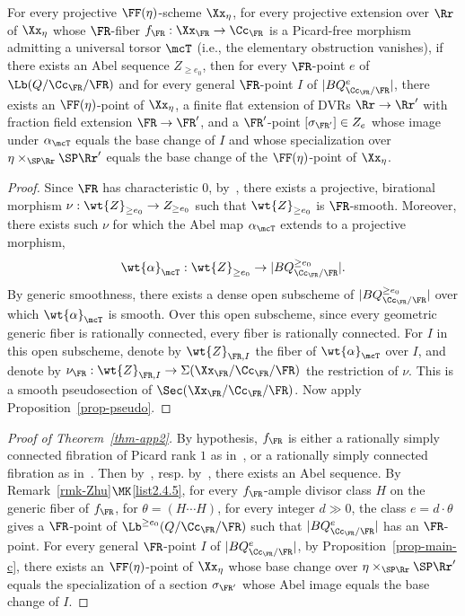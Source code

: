\begin{prop}\label{prop-main-c}
For every projective $\FF(\eta)$-scheme $\Xx_\eta$, for every projective extension over $\Rr$ of $\Xx_\eta$ whose $\FR$-fiber $f_\FR:\Xx_\FR \to
\Cc_\FR$ is a Picard-free morphism admitting a universal torsor $\mcT$ (i.e., the elementary obstruction vanishes), if there exists an Abel sequence $Z_{\geq e_0}$, then for every $\FR$-point $e$ of $\Lb(Q/\Cc_\FR/\FR)$ and for every general $\FR$-point $I$ of $|BQ^e_{\Cc_\FR/\FR}|$, there exists an $\FF(\eta)$-point of $\Xx_\eta$, a finite flat extension of DVRs $\Rr \to \Rr'$ with fraction field extension $\FR\to \FR'$, and a $\FR'$-point $[\sigma_{\FR'}] \in Z_{e}$ whose image under $\alpha_{\mcT}$ equals the base change of $I$ and whose specialization over $\eta \times_{\SP \Rr}\SP \Rr'$ equals the base change of the $\FF(\eta)$-point of $\Xx_\eta$.
\end{prop}

\begin{proof}
Since $\FR$ has characteristic $0$, by~\cite{Hir}, there exists a projective, birational morphism $\nu:\wt{Z}_{\geq e_0} \to Z_{\geq e_0}$ such that $\wt{Z}_{\geq e_0}$ is $\FR$-smooth. Moreover, there exists such $\nu$ for which the Abel map $\alpha_{\mcT}$ extends to a projective morphism,
\[
\wt{\alpha}_{\mcT}:\wt{Z}_{\geq e_0} \to |BQ^{\geq e_0}_{\Cc_\FR/\FR}|.
\]
By generic smoothness, there exists a dense open subscheme of $|BQ^{\geq e_0}_{\Cc_\FR/\FR}|$ over which $\wt{\alpha}_{\mcT}$ is smooth. Over this open subscheme, since every geometric generic fiber is rationally connected, every fiber is rationally connected. For $I$ in this open subscheme, denote by $\wt{Z}_{\FR,I}$ the fiber of $\wt{\alpha}_{\mcT}$ over $I$, and denote by $\nu_{\FR}:\wt{Z}_{\FR,I}
\to \Sigma(\Xx_\FR/\Cc_\FR/\FR)$ the restriction of $\nu$. This is a smooth pseudosection of $\Sec(\Xx_\FR/\Cc_\FR/\FR)$. Now apply Proposition~\ref{prop-pseudo}.
\end{proof}

\begin{proof}[Proof of Theorem~\ref{thm-app2}]
By hypothesis, $f_\FR$ is either a rationally simply connected fibration of Picard rank $1$ as in~\cite[Theorem~13.1]{dJHS}, or a rationally simply connected fibration as in~\cite[5.1]{Zhu}. Then by~\cite[Theorem~13.1]{dJHS}, resp. by~\cite[Theorem~5.12]{Zhu}, there exists an Abel sequence. By Remark~\ref{rmk-Zhu}$\MK$\eqref{list2.4.5}, for every $f_\FR$-ample divisor class $H$ on the generic fiber of $f_\FR$, for $\theta=(H\cdots H)$, for every integer $d\gg 0$, the class $e=d\cdot \theta$ gives a $\FR$-point of $\Lb^{\geq e_0}(Q/\Cc_\FR/\FR)$ such that $|BQ^e_{\Cc_\FR/\FR}|$ has an $\FR$-point. For every general $\FR$-point $I$ of $|BQ^e_{\Cc_\FR/\FR}|$, by Proposition~\ref{prop-main-c}, there exists an $\FF(\eta)$-point of $\Xx_\eta$ whose base change over $\eta\times_{\SP \Rr}\SP \Rr'$ equals the specialization of a section $\sigma_{\FR'}$ whose Abel image equals the base change of $I$.
\end{proof}



